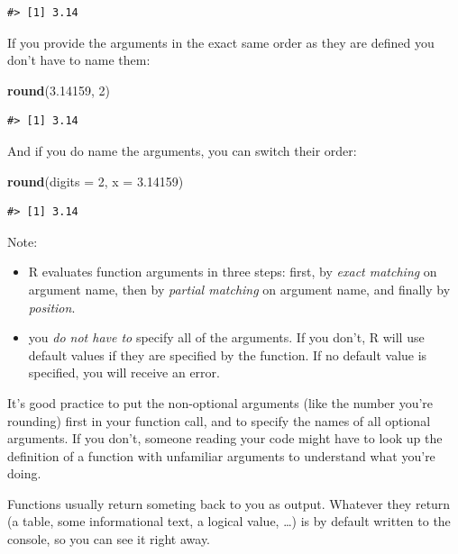 \documentclass[
]{book}
\newenvironment{Shaded}{\begin{snugshade}}{\end{snugshade}}
\newcommand{\AttributeTok}[1]{\textcolor[rgb]{0.13,0.29,0.53}{#1}}
\newcommand{\DecValTok}[1]{\textcolor[rgb]{0.00,0.00,0.81}{#1}}
\newcommand{\FloatTok}[1]{\textcolor[rgb]{0.00,0.00,0.81}{#1}}
\newcommand{\FunctionTok}[1]{\textcolor[rgb]{0.13,0.29,0.53}{\textbf{#1}}}
\newcommand{\NormalTok}[1]{#1}
\begin{document}
\begin{verbatim}
#> [1] 3.14
\end{verbatim}

If you provide the arguments in the exact same order as they are defined you
don't have to name them:

\begin{Shaded}
\begin{Highlighting}[]
\FunctionTok{round}\NormalTok{(}\FloatTok{3.14159}\NormalTok{, }\DecValTok{2}\NormalTok{)}
\end{Highlighting}
\end{Shaded}

\begin{verbatim}
#> [1] 3.14
\end{verbatim}

And if you do name the arguments, you can switch their order:

\begin{Shaded}
\begin{Highlighting}[]
\FunctionTok{round}\NormalTok{(}\AttributeTok{digits =} \DecValTok{2}\NormalTok{, }\AttributeTok{x =} \FloatTok{3.14159}\NormalTok{)}
\end{Highlighting}
\end{Shaded}

\begin{verbatim}
#> [1] 3.14
\end{verbatim}

Note:

\begin{itemize}
\item
  R evaluates function arguments in three steps: first, by \emph{exact matching} on argument name, then by \emph{partial matching} on argument name, and finally by \emph{position}.
\item
  you \emph{do not have to} specify all of the arguments. If you don't, R will use default values if they are specified by the function. If no default value is specified, you will receive an error.
\end{itemize}

It's good practice to put the non-optional arguments (like the number you're
rounding) first in your function call, and to specify the names of all optional
arguments. If you don't, someone reading your code might have to look up the
definition of a function with unfamiliar arguments to understand what you're
doing.

Functions usually return someting back to you as output. Whatever they return (a table, some informational text, a logical value, \ldots) is by default written to the console, so you can see it right away.
\end{document}
